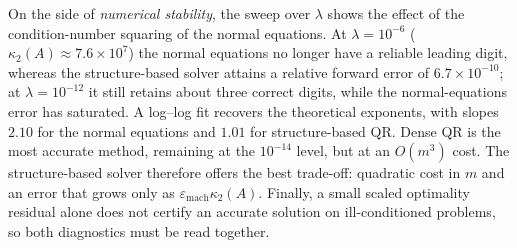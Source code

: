 \noindent On the side of \emph{numerical stability}, the sweep over $\lambda$
shows the effect of the condition-number squaring of the normal equations.
At $\lambda=10^{-6}$ ($\kappa_2(A)\approx7.6\times10^{7}$) the normal
equations no longer have a reliable leading digit, whereas the
structure-based solver attains a relative forward error of
$6.7\times10^{-10}$; at $\lambda=10^{-12}$ it still retains about three
correct digits, while the normal-equations error has saturated. A log--log
fit recovers the theoretical exponents, with slopes $2.10$ for the normal
equations and $1.01$ for structure-based QR. Dense QR is the most accurate
method, remaining at the $10^{-14}$ level, but at an $O(m^3)$ cost. The
structure-based solver therefore offers the best trade-off: quadratic cost in
$m$ and an error that grows only as $\varepsilon_{\mathrm{mach}}\kappa_2(A)$.
Finally, a small scaled optimality residual alone does not certify an
accurate solution on ill-conditioned problems, so both diagnostics must be
read together.